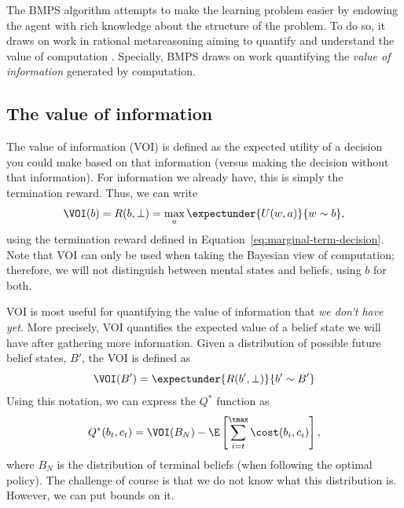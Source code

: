The BMPS algorithm attempts to make the learning problem easier by endowing the agent with rich knowledge about the structure of the problem. To do so, it draws on work in rational metareasoning aiming to quantify and understand the value of computation \citep{matheson1968economic,horvitz1987reasoning,russell1991principles}. Specially, BMPS draws on work quantifying the \emph{value of information} generated by computation. 

\subsection{The value of information}\label{sec:voi}

The value of information (VOI) is defined as the expected utility of a decision you could make based on that information (versus making the decision without that information). For information we already have, this is simply the termination reward. Thus, we can write
%
\begin{equation}\label{eq:main-voi}
  \VOI(b) = R(b, \bot) = \max_a \expectunder{U(w, a)}{w \sim b},
\end{equation}
using the termination reward defined in Equation~\ref{eq:marginal-term-decision}. Note that VOI can only be used when taking the Bayesian view of computation; therefore, we will not distinguish between mental states and beliefs, using $b$ for both.

VOI is most useful for quantifying the value of information that \emph{we don't have yet}. More precisely, VOI quantifies the expected value of a belief state we will have after gathering more information. Given a distribution of possible future belief states, $B'$, the VOI is defined as
%
\begin{equation}
  \VOI(B') = \expectunder{R(b', \bot)}{b' \sim B'}
\end{equation}
%
Using this notation, we can express the $Q^*$ function as
%
\begin{equation}\label{eq:Q-VOI}
  Q^*(b_t, c_t) = 
    \VOI(B_N) - \E\left[\sum_{i=t}^{\tmax} \cost(b_i, c_i) \right],
\end{equation}
where $B_N$ is the distribution of terminal beliefs (when following the optimal policy). The challenge of course is that we do not know what this distribution is. However, we can put bounds on it.

